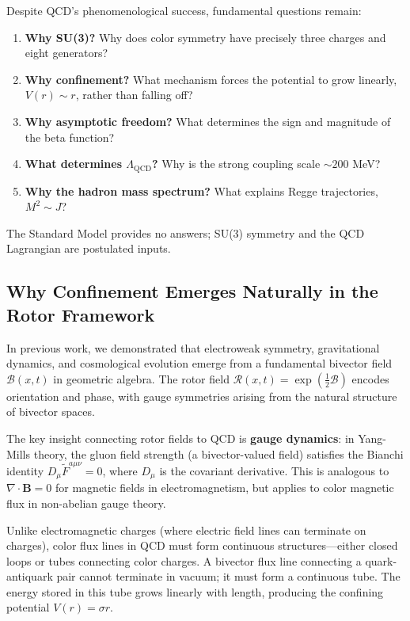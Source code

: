 \documentclass[11pt,a4paper]{article}
\newcommand{\Rotor}{\mathcal{R}}
\newcommand{\Biv}{\mathcal{B}}
\theoremstyle{definition}
\theoremstyle{plain}
\theoremstyle{remark}
\begin{document}
Despite QCD's phenomenological success, fundamental questions remain:
\begin{enumerate}[leftmargin=*,itemsep=3pt]
  \item \textbf{Why SU(3)?} Why does color symmetry have precisely three charges and eight generators?
  \item \textbf{Why confinement?} What mechanism forces the potential to grow linearly, $V(r) \sim r$, rather than falling off?
  \item \textbf{Why asymptotic freedom?} What determines the sign and magnitude of the beta function?
  \item \textbf{What determines $\Lambda_{\mathrm{QCD}}$?} Why is the strong coupling scale $\sim 200$ MeV?
  \item \textbf{Why the hadron mass spectrum?} What explains Regge trajectories, $M^2 \sim J$?
\end{enumerate}

The Standard Model provides no answers; SU(3) symmetry and the QCD Lagrangian are postulated inputs.

\subsection{Why Confinement Emerges Naturally in the Rotor Framework}

In previous work, we demonstrated that electroweak symmetry, gravitational dynamics, and cosmological evolution emerge from a fundamental bivector field $\Biv(x,t)$ in geometric algebra. The rotor field $\Rotor(x,t) = \exp(\frac{1}{2}\Biv)$ encodes orientation and phase, with gauge symmetries arising from the natural structure of bivector spaces.

The key insight connecting rotor fields to QCD is \textbf{gauge dynamics}: in Yang-Mills theory, the gluon field strength (a bivector-valued field) satisfies the Bianchi identity $D_\mu \tilde{F}^{a\mu\nu} = 0$, where $D_\mu$ is the covariant derivative. This is analogous to $\nabla \cdot \mathbf{B} = 0$ for magnetic fields in electromagnetism, but applies to color magnetic flux in non-abelian gauge theory.

Unlike electromagnetic charges (where electric field lines can terminate on charges), color flux lines in QCD must form continuous structures---either closed loops or tubes connecting color charges. A bivector flux line connecting a quark-antiquark pair cannot terminate in vacuum; it must form a continuous tube. The energy stored in this tube grows linearly with length, producing the confining potential $V(r) = \sigma r$.
\end{document}
